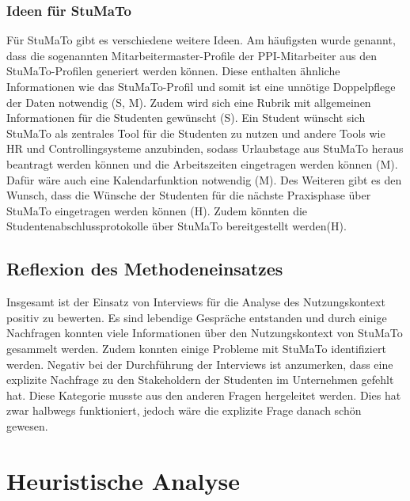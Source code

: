 \documentclass[
  12pt,
  ngerman,
  a4paper,
]{article}
\begin{document}
\hypertarget{ideen-fuxfcr-stumato}{%
\subsubsection{Ideen für StuMaTo}\label{ideen-fuxfcr-stumato}}

Für StuMaTo gibt es verschiedene weitere Ideen. Am häufigsten wurde
genannt, dass die sogenannten Mitarbeitermaster-Profile der
PPI-Mitarbeiter aus den StuMaTo-Profilen generiert werden können. Diese
enthalten ähnliche Informationen wie das StuMaTo-Profil und somit ist
eine unnötige Doppelpflege der Daten notwendig (S, M). Zudem wird sich
eine Rubrik mit allgemeinen Informationen für die Studenten gewünscht
(S). Ein Student wünscht sich StuMaTo als zentrales Tool für die
Studenten zu nutzen und andere Tools wie HR und Controllingsysteme
anzubinden, sodass Urlaubstage aus StuMaTo heraus beantragt werden
können und die Arbeitszeiten eingetragen werden können (M). Dafür wäre
auch eine Kalendarfunktion notwendig (M). Des Weiteren gibt es den
Wunsch, dass die Wünsche der Studenten für die nächste Praxisphase über
StuMaTo eingetragen werden können (H). Zudem könnten die
Studentenabschlussprotokolle über StuMaTo bereitgestellt werden(H).

\hypertarget{reflexion-des-methodeneinsatzes}{%
\subsection{Reflexion des
Methodeneinsatzes}\label{reflexion-des-methodeneinsatzes}}

Insgesamt ist der Einsatz von Interviews für die Analyse des
Nutzungskontext positiv zu bewerten. Es sind lebendige Gespräche
entstanden und durch einige Nachfragen konnten viele Informationen über
den Nutzungskontext von StuMaTo gesammelt werden. Zudem konnten einige
Probleme mit StuMaTo identifiziert werden. Negativ bei der Durchführung
der Interviews ist anzumerken, dass eine explizite Nachfrage zu den
Stakeholdern der Studenten im Unternehmen gefehlt hat. Diese Kategorie
musste aus den anderen Fragen hergeleitet werden. Dies hat zwar halbwegs
funktioniert, jedoch wäre die explizite Frage danach schön gewesen.

\newpage

\hypertarget{sec:heur-anal}{%
\section{Heuristische Analyse}\label{sec:heur-anal}}
\end{document}
